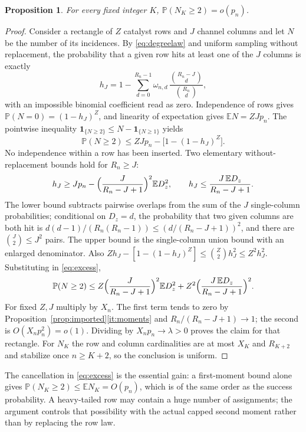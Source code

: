\documentclass[11pt,letterpaper]{article}
\theoremstyle{plain}
\newtheorem{proposition}[theorem]{Proposition}
\theoremstyle{definition}
\theoremstyle{remark}
\numberwithin{equation}{section}
\newcommand{\PP}{\mathbb P}
\newcommand{\EE}{\mathbb E}
\newcommand{\ind}{\mathbf 1}
\begin{document}
\begin{proposition}\label{prop:multiple}
For every fixed integer $K$, $\PP(N_K\ge2)=o(p_n)$.
\end{proposition}
\begin{proof}
Consider a rectangle of $Z$ catalyst rows and $J$ channel columns and let $N$ be the number of its incidences. By \eqref{eq:degreelaw} and uniform sampling without replacement, the probability that a given row hits at least one of the $J$ columns is exactly
\begin{equation}\label{eq:hit}
 h_J=1-\sum_{d=0}^{R_n-1}\omega_{n,d}\,\frac{\binom{R_n-J}{d}}{\binom{R_n}{d}},
\end{equation}
with an impossible binomial coefficient read as zero. Independence of rows gives $\PP(N=0)=(1-h_J)^Z$, and linearity of expectation gives $\EE N=ZJp_n$. The pointwise inequality $\ind_{\{N\ge2\}}\le N-\ind_{\{N\ge1\}}$ yields
\begin{equation}\label{eq:excess}
 \PP(N\ge2)\le ZJp_n-\bigl[1-(1-h_J)^Z\bigr] .
\end{equation}
No independence within a row has been inserted. Two elementary without-replacement bounds hold for $R_n\ge J$:
\begin{equation}\label{eq:hitbounds}
 h_J\ge Jp_n-\Bigl(\frac{J}{R_n-J+1}\Bigr)^2\EE D_z^2,\qquad
 h_J\le\frac{J\,\EE D_z}{R_n-J+1} .
\end{equation}
The lower bound subtracts pairwise overlaps from the sum of the $J$ single-column probabilities; conditional on $D_z=d$, the probability that two given columns are both hit is $d(d-1)/(R_n(R_n-1))\le(d/(R_n-J+1))^2$, and there are $\binom J2\le J^2$ pairs. The upper bound is the single-column union bound with an enlarged denominator. Also $Zh_J-[1-(1-h_J)^Z]\le\binom Z2h_J^2\le Z^2h_J^2$. Substituting in \eqref{eq:excess},
\begin{equation}\label{eq:rectangle}
 \PP(N\ge2)\le Z\Bigl(\frac{J}{R_n-J+1}\Bigr)^2\EE D_z^2+Z^2\Bigl(\frac{J\,\EE D_z}{R_n-J+1}\Bigr)^2 .
\end{equation}
For fixed $Z,J$ multiply by $X_n$. The first term tends to zero by Proposition~\ref{prop:imported}\ref{it:moments} and $R_n/(R_n-J+1)\to1$; the second is $O(X_np_n^2)=o(1)$. Dividing by $X_np_n\to\lambda>0$ proves the claim for that rectangle. For $N_K$ the row and column cardinalities are at most $X_K$ and $R_{K+2}$ and stabilize once $n\ge K+2$, so the conclusion is uniform.
\end{proof}

The cancellation in \eqref{eq:excess} is the essential gain: a first-moment bound alone gives $\PP(N_K\ge2)\le\EE N_K=O(p_n)$, which is of the same order as the success probability. A heavy-tailed row may contain a huge number of assignments; the argument controls that possibility with the actual capped second moment rather than by replacing the row law.
\end{document}

